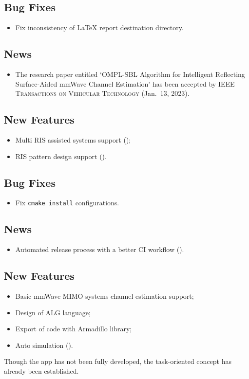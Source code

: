 \subsection*{Bug Fixes}
\begin{itemize}
  \item Fix inconsistency of \LaTeX{} report destination directory.
\end{itemize}
\subsection*{News}
\begin{itemize}
  \item The research paper entitled `OMPL-SBL Algorithm for Intelligent Reflecting Surface-Aided mmWave Channel Estimation' \cite{zhao2023ompl} has been accepted by \textsc{IEEE Transactions on Vehicular Technology} (Jan.~13, 2023).
\end{itemize}

\subsection*{New Features}
\begin{itemize}
  \item Multi RIS assisted systems support ();
  \item RIS pattern design support ().
\end{itemize}
\subsection*{Bug Fixes}
\begin{itemize}
  \item Fix \texttt{cmake install} configurations.
\end{itemize}
\subsection*{News}
\begin{itemize}
  \item Automated release process with a better CI workflow ().
\end{itemize}

\subsection*{New Features}
\begin{itemize}
  \item Basic mmWave MIMO systems channel estimation support;
  \item Design of ALG language;
  \item Export of code with Armadillo library;
  \item Auto simulation ().
\end{itemize}

Though the app has not been fully developed,
the task-oriented concept has already been established.


